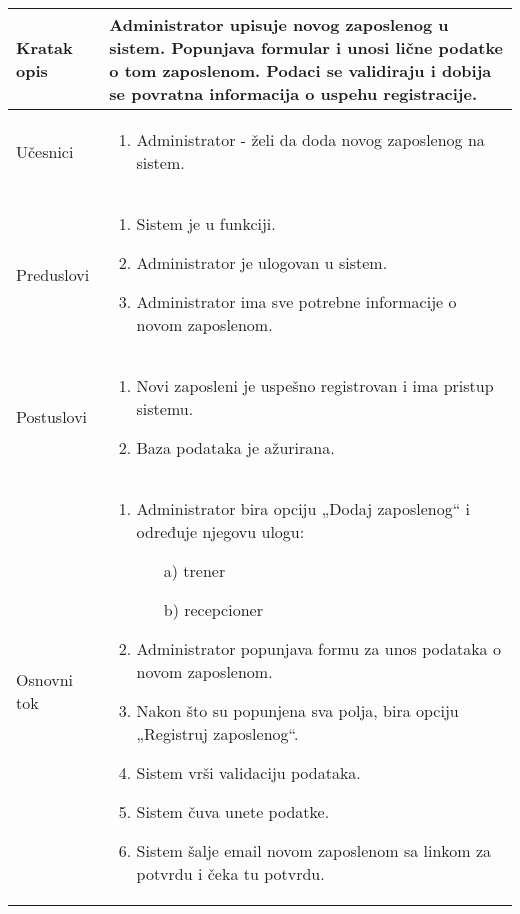 \documentclass[../main.tex]{subfiles}
\begin{document}
\begin{longtable}{| p{} | p{} |} 

\hline
    Kratak opis &  Administrator upisuje novog zaposlenog u sistem. Popunjava formular i unosi lične podatke o tom zaposlenom. Podaci se validiraju i dobija se povratna informacija o uspehu registracije.\\ 
\hline    
    Učesnici & 
    	\begin{enumerate}
        \item Administrator - želi da doda novog zaposlenog na sistem.
     \end{enumerate}\\
\hline
   Preduslovi & \begin{enumerate}
       \item Sistem je u funkciji.
       \item Administrator je ulogovan u sistem.
       \item Administrator ima sve potrebne informacije o novom zaposlenom.
   \end{enumerate}\\
\hline  
    Postuslovi & \begin{enumerate}
        \item Novi zaposleni je uspešno registrovan i ima pristup sistemu.
        \item Baza podataka je ažurirana.
    \end{enumerate}\\
\hline
    Osnovni tok & \begin{enumerate}
        \item Administrator bira opciju „Dodaj zaposlenog“ i određuje njegovu ulogu: 
            \begin{itemize}
                \item[a)] trener
                \item[b)] recepcioner
            \end{itemize}
        \item Administrator popunjava formu za unos podataka o novom zaposlenom.	
        \item Nakon što su popunjena sva polja, bira opciju „Registruj zaposlenog“.
        \item Sistem vrši validaciju podataka.
        \item Sistem čuva unete podatke.
        \item Sistem šalje email novom zaposlenom sa linkom za potvrdu i čeka tu potvrdu.

\end{enumerate}
\end{longtable}
\end{document}
